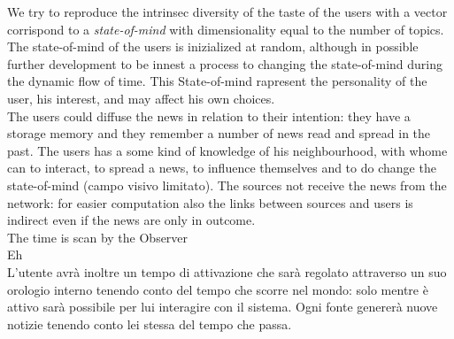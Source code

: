 \documentclass[11pt]{article} %
\begin{document}
We try to reproduce the intrinsec diversity of the taste of the users with a vector corrispond to a {\itshape state-of-mind} with dimensionality equal to the number of topics. The state-of-mind of the users is inizialized at random, although in possible further development to be innest a process to changing the state-of-mind during the dynamic flow of time. This State-of-mind rapresent the personality of the user, his interest, and may affect his own choices.
\\
The users could diffuse the news in relation to their intention: they have a storage memory and they remember a number of news read and spread in the past.
The users has a some kind of knowledge of his neighbourhood, with whome can to interact, to spread a news, to influence themselves and to do change the state-of-mind (campo visivo limitato). The sources not receive the news from the network: for easier computation also the links between sources and users is indirect even if the news are only in outcome.
\\
The time is scan by the Observer\\
Eh
\\
L’utente avrà inoltre un tempo di attivazione che sarà regolato attraverso un suo orologio interno
tenendo conto del tempo che scorre nel mondo: solo mentre è attivo sarà possibile per lui interagire
con il sistema. 
Ogni fonte genererà nuove notizie tenendo conto lei stessa del
tempo che passa.
\end{document}
